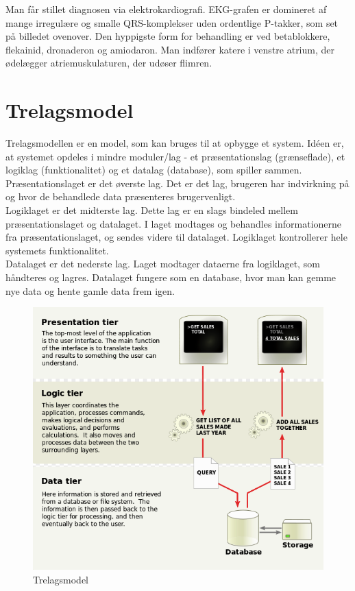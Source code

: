 Man får stillet diagnosen via elektrokardiografi. EKG-grafen er domineret af mange irregulære og smalle QRS-komplekser uden ordentlige P-takker, som set på billedet ovenover. Den hyppigste form for behandling er ved betablokkere, flekainid, dronaderon og amiodaron. Man indfører katere i venstre atrium, der ødelægger atriemuskulaturen, der udøser flimren.

\section{Trelagsmodel}
Trelagsmodellen er en model, som kan bruges til at opbygge et system. Idéen er, at systemet opdeles i mindre moduler/lag - et præsentationslag (grænseflade), et logiklag (funktionalitet) og et datalag (database), som spiller sammen. \\
Præsentationslaget er det øverste lag. Det er det lag, brugeren har indvirkning på og hvor de behandlede data præsenteres brugervenligt. \\
Logiklaget er det midterste lag. Dette lag er en slags bindeled mellem præsentationslaget og datalaget. I laget modtages og behandles informationerne fra præsentationslaget, og sendes videre til datalaget. Logiklaget kontrollerer hele systemets funktionalitet.\\
Datalaget er det nederste lag. Laget modtager dataerne fra logiklaget, som håndteres og lagres. Datalaget fungere som en database, hvor man kan gemme nye data og hente gamle data frem igen.\\

\begin{figure}[htb]
	\centering
	\includegraphics[width=1\textwidth]{Figurer/Snip20150415_39}
	\caption{Trelagsmodel\protect\footnotemark}
\end{figure}

